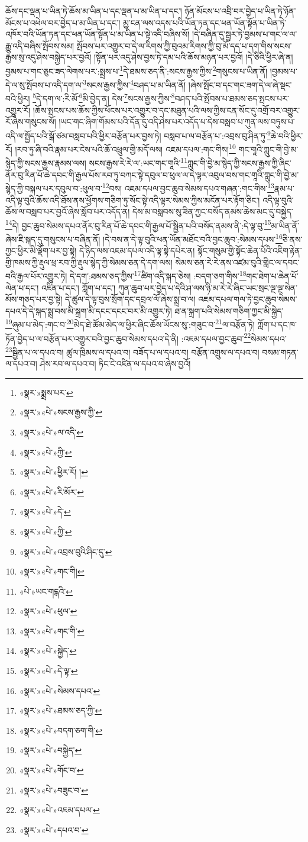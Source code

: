 ཆོས་དང་ལྡན་པ་ཡིན་ཏེ་ཆོས་མ་ཡིན་པ་དང་ལྡན་པ་མ་ཡིན་པ་དང་། ཉོན་མོངས་པ་འབྲི་བར་བྱེད་པ་ཡིན་ཏེ་ཉོན་མོངས་པ་འཕེལ་བར་བྱེད་པ་མ་ཡིན་པ་དང་། མྱ་ངན་ལས་འདས་པའི་ཡོན་ཏན་དང་ཕན་ཡོན་སྟོན་པ་ཡིན་ཏེ་འཁོར་བའི་ཡོན་ཏན་དང་ཕན་ཡོན་སྟོན་པ་མ་ཡིན་པ་སྟེ་འདི་བཞིས་སོ། །དེ་བཞིན་དུ་སྦྱར་ཏེ་བྱམས་པ་གང་ལ་ལ་རྒྱུ་འདི་བཞིས་སྤོབས་སམ། སྤོབས་པར་འགྱུར་བ་དེ་ལ་རིགས་ཀྱི་བུའམ་རིགས་ཀྱི་བུ་མོ་དད་པ་དག་གིས་སངས་རྒྱས་སུ་འདུ་ཤེས་བསྐྱེད་པར་བྱའོ། །སྟོན་པར་འདུ་ཤེས་བྱས་ཏེ་དམ་པའི་ཆོས་མཉན་པར་བྱའོ། །དེ་ཅིའི་ཕྱིར་ཞེ་ན། བྱམས་པ་གང་ཅུང་ཟད་ལེགས་པར་:སྨྲས་པ་\footnote{«སྣར་»སྨྲས་པར་}དེ་ཐམས་ཅད་ནི་:སངས་རྒྱས་ཀྱིས་\footnote{«སྣར་»«པེ་»སངས་རྒྱས་ཀྱི་}གསུངས་པ་ཡིན་ནོ། །བྱམས་པ་དེ་ལ་སུ་སྤོབས་པ་འདི་དག་ལ་\footnote{«སྣར་»«པེ་»ལ་འདི་}སངས་རྒྱས་ཀྱིས་\footnote{«སྣར་»«པེ་»ཀྱི་}བཤད་པ་མ་ཡིན་ནོ། །ཞེས་སྤོང་བ་དང་གང་ཟག་དེ་ལ་ཞེ་སྡང་བའི་ཕྱིར། \footnote{«སྣར་»«པེ་»ཕྱིར་རོ། ། }དེ་དག་ལ་:རི་མོ་\footnote{«སྣར་»«པེ་»རི་མོར་}མི་བྱེད་ན། དེས་\footnote{«སྣར་»«པེ་»དེ་}སངས་རྒྱས་ཀྱིས་\footnote{«སྣར་»«པེ་»ཀྱི་}བཤད་པའི་སྤོབས་པ་ཐམས་ཅད་སྤངས་པར་འགྱུར་རོ། །ཆོས་སྤངས་པས་ཆོས་ཀྱིས་ཕོངས་པར་འགྱུར་བ་དང་མཐུན་པའི་ལས་ཀྱིས་ངན་སོང་དུ་འགྲོ་བར་འགྱུར་རོ་ཞེས་གསུངས་སོ། །ཡང་གང་ཞིག་གོམས་པའི་དོན་དུ་འདི་ཤེས་པར་འདོད་པ་དེས་བསླབ་པ་ཀུན་ལས་བཏུས་པ་འདི་ལ་སྤྱོད་པའི་སྒོ་ཙམ་བསླབ་པའི་ཕྱིར་བརྩོན་པར་བྱས་ཏེ། བསླབ་པ་ལ་བརྩོན་པ་:འབྲས་བུ་ཤིན་ཏུ་\footnote{«སྣར་»«པེ་»འབྲས་བུའི་ཤིང་དུ་}ཆེ་བའི་ཕྱིར་རོ། །རབ་ཏུ་ཞི་བའི་རྣམ་པར་ངེས་པའི་ཆོ་འཕྲུལ་གྱི་མདོ་ལས། འཇམ་དཔལ་:གང་གིས།\footnote{«སྣར་»«པེ་»གང་གི།} གང་གཱའི་ཀླུང་གི་བྱེ་མ་སྙེད་ཀྱི་སངས་རྒྱས་རྣམས་ལས། སངས་རྒྱས་རེ་རེ་ལ་:ཡང་གང་གཱའི་\footnote{«པེ་»ཡང་གངྒའི་}ཀླུང་གི་བྱེ་མ་སྙེད་ཀྱི་སངས་རྒྱས་ཀྱི་ཞིང་ནོར་བུ་རིན་པོ་ཆེ་དབང་གི་རྒྱལ་པོས་རབ་ཏུ་བཀང་སྟེ་དབུལ་བ་ཕུལ་ལ་དེ་ལྟར་འབུལ་བས་གང་གཱའི་ཀླུང་གི་བྱེ་མ་སྙེད་ཀྱི་བསྐལ་པར་དབུལ་བ་:ཕུལ་བ་\footnote{«སྣར་»«པེ་»ཕུལ་}བས། འཇམ་དཔལ་བྱང་ཆུབ་སེམས་དཔའ་གཞན་:གང་གིས་\footnote{«སྣར་»«པེ་»གང་གི་}རྣམ་པ་འདི་ལྟ་བུའི་ཆོས་འདི་ཐོས་ནས་ཕྱོགས་གཅིག་ཏུ་སོང་སྟེ་འདི་ལྟར་སེམས་ཀྱིས་མངོན་པར་རྟོག་ཅིང་། འདི་ལྟ་བུའི་ཆོས་ལ་བསླབ་པར་བྱའོ་ཞེས་སློབ་པར་འདོད་ན། དེས་མ་བསླབས་སུ་ཟིན་ཀྱང་བསོད་ནམས་ཆེས་མང་དུ་བསྐྱེད་\footnote{«སྣར་»«པེ་»སྐྱེད་}དེ། བྱང་ཆུབ་སེམས་དཔའ་ནོར་བུ་རིན་པོ་ཆེ་དབང་གི་རྒྱལ་པོ་སྦྱིན་པའི་བསོད་ནམས་ནི་:དེ་ལྟ་བུ་\footnote{«སྣར་»«པེ་»དེ་ལྟ་}མ་ཡིན་ནོ་ཞེས་ཇི་སྐད་དུ་གསུངས་པ་བཞིན་ནོ། །དེ་བས་ན་དེ་ལྟ་བུའི་ཕན་ཡོན་མཐོང་བའི་བྱང་ཆུབ་:སེམས་དཔས་\footnote{«སྣར་»«པེ་»སེམས་དཔའ་}ཅི་ནས་ཀྱང་ཕྱིར་མི་ལྡོག་པར་བྱ་སྟེ། དེ་ཉིད་ལས་འཇམ་དཔལ་འདི་ལྟ་སྟེ་དཔེར་ན། སྟོང་གསུམ་གྱི་སྟོང་ཆེན་པོའི་འཇིག་རྟེན་གྱི་ཁམས་ཀྱི་རྡུལ་ཕྲ་རབ་ཀྱི་རྡུལ་སྙེད་ཀྱི་སེམས་ཅན་དེ་དག་ལས། སེམས་ཅན་རེ་རེ་ནས་འཛམ་བུའི་གླིང་ལ་དབང་བའི་རྒྱལ་པོར་འགྱུར་ཏེ། དེ་དག་:ཐམས་ཅད་ཀྱིས་\footnote{«སྣར་»«པེ་»ཐམས་ཅད་ཀྱི་}ཚིག་འདི་སྐད་ཅེས། :བདག་ཅག་གིས་\footnote{«སྣར་»«པེ་»བདག་ཅག་གི་}གང་ཐེག་པ་ཆེན་པོ་ལེན་པ་དང་། འཛིན་པ་དང་། ཀློག་པ་དང་། ཀུན་ཆུབ་པར་བྱེད་པ་དེའི་ཤ་ལས་ཉི་མ་རེ་རེ་ཞིང་ཡང་སྲང་ལྔ་ལྔ་སེན་མོས་གཅད་པར་བྱ་སྟེ། དེ་ཚུལ་དེ་ལྟ་བུས་སྲོག་དང་དབྲལ་ལོ་ཞེས་སྨྲ་བ་ལ། འཇམ་དཔལ་གལ་ཏེ་བྱང་ཆུབ་སེམས་དཔའ་དེ་དེ་སྐད་སྨྲ་བས་མི་སྐྲག་མི་དངང་དངང་བར་མི་འགྱུར་ཏེ། ཐ་ན་སྐྲག་པའི་སེམས་གཅིག་ཀྱང་མི་སྐྱེད་\footnote{«སྣར་»«པེ་»བསྐྱེད་}ཞུམ་པ་མེད་:གང་བ་\footnote{«སྣར་»«པེ་»གོང་བ་}མེད་ཐེ་ཚོམ་མེད་ལ་ཕྱིར་ཞིང་ཆོས་ཡོངས་སུ་:གཟུང་བ་\footnote{«སྣར་»«པེ་»བཟུང་བ་}ལ་བརྩོན་ཏེ། ཀློག་པ་དང་ཁ་ཏོན་བྱེད་པ་ལ་བརྩོན་པར་འགྱུར་བའི་བྱང་ཆུབ་སེམས་དཔའ་དེ་ནི། :འཇམ་དཔལ་བྱང་ཆུབ་\footnote{«སྣར་»«པེ་»འཇམ་དཔལ་}སེམས་དཔའ་\footnote{«སྣར་»«པེ་»དཔའ་བ་}སྦྱིན་པ་ལ་དཔའ་བ། ཚུལ་ཁྲིམས་ལ་དཔའ་བ། བཟོད་པ་ལ་དཔའ་བ། བརྩོན་འགྲུས་ལ་དཔའ་བ། བསམ་གཏན་ལ་དཔའ་བ། ཤེས་རབ་ལ་དཔའ་བ། ཏིང་ངེ་འཛིན་ལ་དཔའ་བ་ཞེས་བྱའོ། 